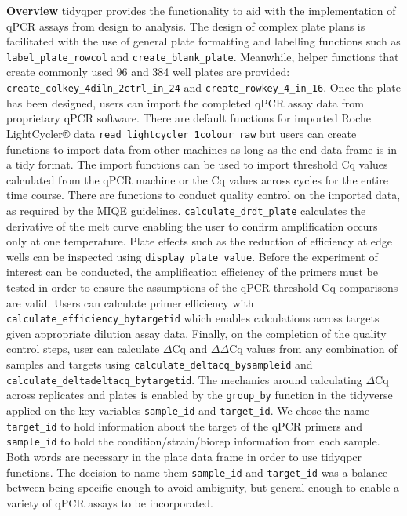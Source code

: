 \documentclass[../main.tex]{subfiles}
\begin{document}
\textbf{Overview}
tidyqpcr provides the functionality to aid with the implementation of qPCR assays from design to analysis. 
The design of complex plate plans is facilitated with the use of general plate formatting and labelling functions such as \lstinline{label_plate_rowcol} and \lstinline{create_blank_plate}. 
Meanwhile, helper functions that create commonly used 96 and 384 well plates are provided: \lstinline{create_colkey_4diln_2ctrl_in_24} and \lstinline{create_rowkey_4_in_16}. 
Once the plate has been designed, users can import the completed qPCR assay data from proprietary qPCR software. 
There are default functions for imported Roche LightCycler® data \lstinline{read_lightcycler_1colour_raw} but users can create functions to import data from other machines as long as the end data frame is in a tidy format.
The import functions can be used to import threshold Cq values calculated from the qPCR  machine or the Cq values across cycles for the entire time course.
There are functions to conduct quality control on the imported data, as required by the MIQE guidelines. 
\lstinline{calculate_drdt_plate} calculates the derivative of the melt curve enabling the user to confirm amplification occurs only at one temperature.
Plate effects such as the reduction of efficiency at edge wells can be inspected using \lstinline{display_plate_value}.
Before the experiment of interest can be conducted, the amplification efficiency of the primers must be tested in order to ensure the assumptions of the qPCR threshold Cq comparisons are valid.
Users can calculate primer efficiency with \lstinline{calculate_efficiency_bytargetid} which enables calculations across targets given appropriate dilution assay data.
Finally, on the completion of the quality control steps, user can calculate $\Delta$Cq and $\Delta\Delta$Cq values from any combination of samples and targets using \lstinline{calculate_deltacq_bysampleid} and \lstinline{calculate_}\lstinline{deltadeltacq_bytargetid}. 
The mechanics around calculating $\Delta$Cq across replicates and plates is enabled by the \lstinline{group_by} function in the tidyverse applied on the key variables \lstinline{sample_id} and \lstinline{target_id}.
We chose the name \lstinline{target_id} to hold information about the target of the qPCR primers and \lstinline{sample_id} to hold the condition/strain/biorep information from each sample.
Both words are necessary in the plate data frame in order to use tidyqpcr functions. 
The decision to name them \lstinline{sample_id} and \lstinline{target_id} was a balance between being specific enough to avoid ambiguity, but general enough to enable a variety of qPCR assays to be incorporated.  
\end{document}
